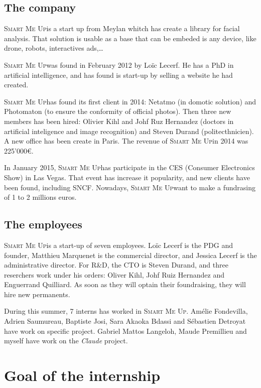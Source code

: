 \documentclass[a4paper,11pt]{custom}
\newcommand{\smu}{\textsc{Smart Me Up}}
\newcommand{\claude}{\textit{Claude}}
\begin{document}
\section{The company}

\smu is a start up from Meylan whitch has create a library for facial
analysis. That solution is usable as a base that can be embeded is any device,
like drone, robots, interactives ads,…

\smu was found in February 2012 by Loïc Lecerf. He has a PhD in artificial
intelligence, and has found is start-up by selling a website he had created.

\smu has found its first client in 2014: Netatmo (in domotic solution) and
Photomaton (to ensure the conformity of official photos). Then three new members
has been hired: Olivier Kihl and Johf Ruz Hernandez (doctors in artificial
inteligence and image recognition) and Steven Durand (politecthnicien). A new
office has been create in Paris. The revenue of \smu in 2014 was 225'000\euro.

In January 2015, \smu has participate in the CES (Consumer Electronics Show) in
Las Vegas. That event has increase it popularity, and new clients have been
found, including SNCF. Nowadays, \smu want to make a fundrasing of 1 to 2
millions euros.

\section{The employees}

\smu is a start-up of seven employees. Loïc Lecerf is the PDG and founder,
Matthieu Marquenet is the commercial director, and Jessica Lecerf is the
administrative director. For R\&D, the CTO is Steven Durand, and three
reserchers work under his orders: Oliver Kihl, Johf Ruiz Hernandez and
Enguerrand Quilliard. As soon as they will optain their foundraising, they will
hire new permanents.

During this summer, 7 interns has worked in \smu. Amélie Fondevilla, Adrien
Saumureau, Baptiste Josi, Sara Akaoka Bdassi and Sébastien Detroyat have work on
specific project. Gabriel Mattos Langeloh, Maude Premillieu and myself have work
on the \claude{} project.

\chapter{Goal of the internship}
\end{document}
